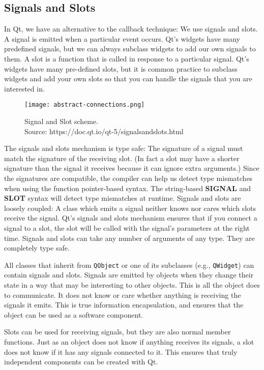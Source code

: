 \subsection{Signals and Slots}
\label{ssec:soft-sig-solt-detail}
In Qt, we have an alternative to the callback technique: We use signals and
slots. A signal is emitted when a particular event occurs. Qt's widgets have
many predefined signals, but we can always subclass widgets to add our own
signals to them. A slot is a function that is called in response to a particular
signal. Qt's widgets have many pre-defined slots, but it is common practice to
subclass widgets and add your own slots so that you can handle the signals that
you are interested in. 
%
%
\begin{figure}[htb]
	\centering
	\texttt{[image: abstract-connections.png]}
	\caption{Signal and Slot scheme.\\Source: https://doc.qt.io/qt-5/signalsandslots.html}
	\label{fig:software-signal-slots-scheme}
\end{figure}
%
The signals and slots mechanism is type safe: The signature of a signal must
match the signature of the receiving slot. (In fact a slot may have a shorter
signature than the signal it receives because it can ignore extra arguments.)
Since the signatures are compatible, the compiler can help us detect type
mismatches when using the function pointer-based syntax. The string-based
\textbf{SIGNAL} and \textbf{SLOT} syntax will detect type mismatches at runtime.
Signals and slots are loosely coupled: A class which emits a signal neither
knows nor cares which slots receive the signal. Qt's signals and slots mechanism
ensures that if you connect a signal to a slot, the slot will be called with the
signal's parameters at the right time. Signals and slots can take any number of
arguments of any type. They are completely type safe.

All classes that inherit from \texttt{QObject} or one of its subclasses (e.g.,
\texttt{QWidget}) can contain signals and slots. Signals are emitted by objects
when they change their state in a way that may be interesting to other objects.
This is all the object does to communicate. It does not know or care whether
anything is receiving the signals it emits. This is true information
encapsulation, and ensures that the object can be used as a software component.

Slots can be used for receiving signals, but they are also normal member
functions. Just as an object does not know if anything receives its signals, a
slot does not know if it has any signals connected to it. This ensures that
truly independent components can be created with Qt.

